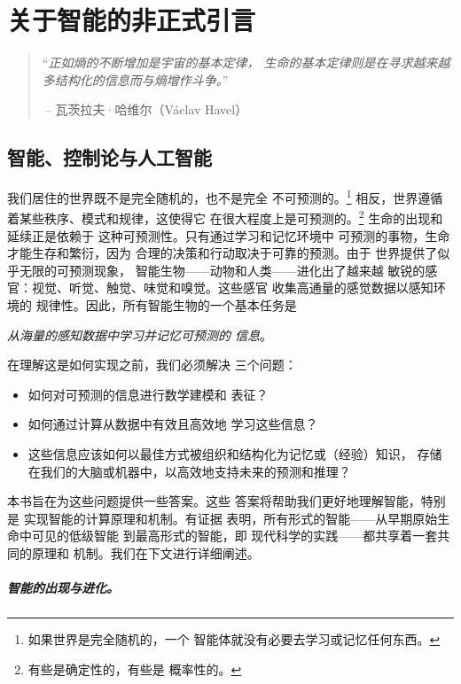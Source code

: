 \documentclass[../../book-main_zh.tex]{subfiles}
\begin{document}
\chapter{关于智能的非正式引言}
\label{ch:intro}

\begin{quote}
    ``{\em 正如熵的不断增加是宇宙的基本定律，
        生命的基本定律则是在寻求越来越多结构化的信息而与熵增作斗争。}''

    $~$\hfill -- 瓦茨拉夫·哈维尔（V\'{a}clav Havel）
\end{quote}
\vspace{5mm}

\section{智能、控制论与人工智能}
我们居住的世界既不是完全随机的，也不是完全
不可预测的。\footnote{如果世界是完全随机的，一个
智能体就没有必要去学习或记忆任何东西。}
相反，世界遵循着某些秩序、模式和规律，这使得它
在很大程度上是可预测的。\footnote{有些是确定性的，有些是
概率性的。} 生命的出现和延续正是依赖于
这种可预测性。只有通过学习和记忆环境中
可预测的事物，生命才能生存和繁衍，因为
合理的决策和行动取决于可靠的预测。由于
世界提供了似乎无限的可预测现象，
智能生物——动物和人类——进化出了越来越
敏锐的感官：视觉、听觉、触觉、味觉和嗅觉。这些感官
收集高通量的感觉数据以感知环境的
规律性。因此，所有智能生物的一个基本任务是
\begin{center}
    \textit{从海量的感知数据中学习并记忆可预测的
    信息}。
\end{center}
在理解这是如何实现之前，我们必须解决
三个问题：
\begin{itemize}
    \item 如何对可预测的信息进行数学建模和
        表征？
    \item 如何通过计算从数据中有效且高效地
        学习这些信息？
    \item 这些信息应该如何以最佳方式被组织和结构化为记忆或（经验）知识，
    存储在我们的大脑或机器中，以高效地支持未来的预测和推理？
\end{itemize}
本书旨在为这些问题提供一些答案。这些
答案将帮助我们更好地理解智能，特别是
实现智能的计算原理和机制。有证据
表明，所有形式的智能——从早期原始生命中可见的低级智能
到最高形式的智能，即
现代科学的实践——都共享着一套共同的原理和
机制。我们在下文进行详细阐述。

\paragraph{智能的出现与进化。}
\end{document}
